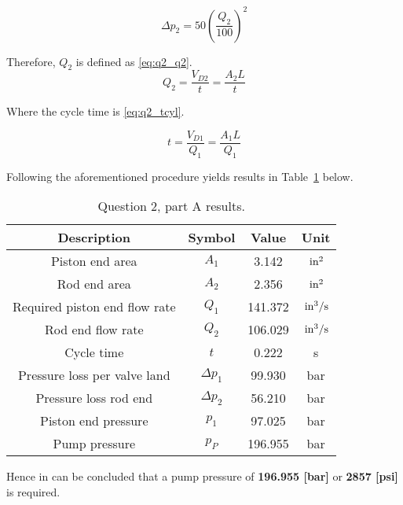 \begin{equation}
	\label{eq:q2_ploss2}
	\Delta p_2 = 50 \left( \frac{Q_2}{100} \right)^2
\end{equation}

Therefore, $Q_2$ is defined as \ref{eq:q2_q2}.
\begin{equation}
	\label{eq:q2_q2}
	Q_2 = \frac{V_{D2}}{t} = \frac{A_2 L}{t}
\end{equation}

Where the cycle time is \ref{eq:q2_tcyl}.

\begin{equation}
	\label{eq:q2_tcyl}
	t = \frac{V_{D1}}{Q_1} = \frac{A_1 L}{Q_1} 
\end{equation}

\pagebreak

Following the aforementioned procedure yields results in Table~\ref{tab:q2a_ans} below.
\begin{table}[H]
	\centering
	\caption{Question 2, part A results.}
	\begin{tabular}{cccc}
		\toprule
		\textbf{Description}          & \textbf{Symbol} & \textbf{Value } & \textbf{Unit}   \\
		\midrule
		Piston end area               & $A_1$           & 3.142           & $\,\mathrm{in^2}$   \\
		Rod end area                  & $A_2$           & 2.356           & $\,\mathrm{in^2}$   \\
		Required piston end flow rate & $Q_1$           & 141.372         & $\,\mathrm{in^3/s}$ \\
		Rod end flow rate             & $Q_2$           & 106.029			& $\,\mathrm{in^3/s}$ \\
		Cycle time                    & $t$             & 0.222           & s               \\
		Pressure loss per valve land  & $\Delta p_1$    & 99.930          & bar             \\
		Pressure loss rod end         & $\Delta p_2$    & 56.210         & bar             \\
		Piston end pressure           & $p_1$           & 97.025          & bar             \\
		Pump pressure                 & $p_P$           & 196.955         & bar             \\
		\bottomrule
	\end{tabular}
	\label{tab:q2a_ans}
\end{table}%

Hence in can be concluded that a pump pressure of \textbf{196.955 [bar]} or \textbf{2857 [psi]} is required.


